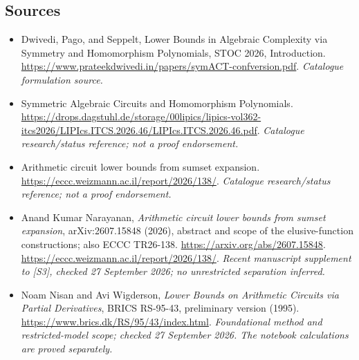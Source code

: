 \documentclass[11pt,a4paper]{article}
\numberwithin{equation}{section}
\begin{document}
\subsection{Sources}
\begin{itemize}\raggedright
\item[\textnormal{[S1]}]\hypertarget{source:statement:1}{} Dwivedi, Pago, and Seppelt, Lower Bounds in Algebraic Complexity via Symmetry and Homomorphism Polynomials, STOC 2026, Introduction.
\url{https://www.prateekdwivedi.in/papers/symACT-confversion.pdf}.
{\small\textit{Catalogue formulation source.}}
\item[\textnormal{[S2]}]\hypertarget{source:statement:2}{} Symmetric Algebraic Circuits and Homomorphism Polynomials.
\url{https://drops.dagstuhl.de/storage/00lipics/lipics-vol362-itcs2026/LIPIcs.ITCS.2026.46/LIPIcs.ITCS.2026.46.pdf}.
{\small\textit{Catalogue research/status reference; not a proof endorsement.}}
\item[\textnormal{[S3]}]\hypertarget{source:statement:3}{} Arithmetic circuit lower bounds from sumset expansion.
\url{https://eccc.weizmann.ac.il/report/2026/138/}.
{\small\textit{Catalogue research/status reference; not a proof endorsement.}}
\item[\textnormal{[E1]}]\hypertarget{extra:statement:1}{} Anand Kumar Narayanan,
\emph{Arithmetic circuit lower bounds from sumset expansion},
arXiv:2607.15848 (2026), abstract and scope of the elusive-function
constructions; also ECCC TR26-138.
\url{https://arxiv.org/abs/2607.15848}.
\url{https://eccc.weizmann.ac.il/report/2026/138/}.
{\small\textit{Recent manuscript supplement to [S3], checked
27 September 2026; no unrestricted separation inferred.}}
\item[\textnormal{[E2]}]\hypertarget{extra:statement:2}{} Noam Nisan and
Avi Wigderson, \emph{Lower Bounds on Arithmetic Circuits via Partial
Derivatives}, BRICS RS-95-43, preliminary version (1995).
\url{https://www.brics.dk/RS/95/43/index.html}.
{\small\textit{Foundational method and restricted-model scope; checked
27 September 2026. The notebook calculations are proved separately.}}

\end{itemize}

\end{document}
